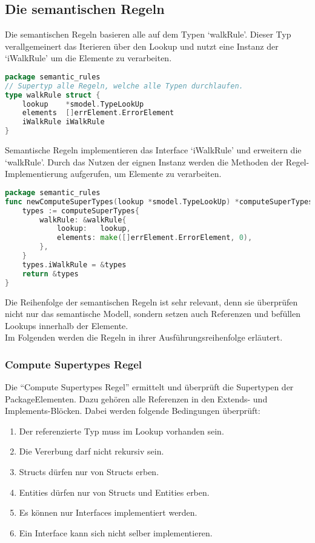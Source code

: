 \documentclass[./einleitung.tex]{subfiles}
\begin{document}
    \subsection{Die semantischen Regeln}\label{subsec:die-semantischen-regeln}
    Die semantischen Regeln basieren alle auf dem Typen `walkRule'.
    Dieser Typ verallgemeinert das Iterieren über den Lookup und nutzt eine Instanz der `iWalkRule' um die Elemente zu verarbeiten.
    \begin{lstlisting}[language=go]
package semantic_rules
// Supertyp alle Regeln, welche alle Typen durchlaufen.
type walkRule struct {
	lookup    *smodel.TypeLookUp
	elements  []errElement.ErrorElement
	iWalkRule iWalkRule
}
    \end{lstlisting}
    Semantische Regeln implementieren das Interface `iWalkRule' und erweitern die `walkRule'.
    Durch das Nutzen der eignen Instanz werden die Methoden der Regel-Implementierung aufgerufen, um Elemente zu verarbeiten.
    \begin{lstlisting}[language=go]
package semantic_rules
func newComputeSuperTypes(lookup *smodel.TypeLookUp) *computeSuperTypes {
	types := computeSuperTypes{
		walkRule: &walkRule{
			lookup:   lookup,
			elements: make([]errElement.ErrorElement, 0),
		},
	}
    types.iWalkRule = &types
    return &types
}\end{lstlisting}

    Die Reihenfolge der semantischen Regeln ist sehr relevant, denn sie überprüfen nicht nur das semantische Modell, sondern setzen auch Referenzen und befüllen Lookups innerhalb der Elemente. \\
    Im Folgenden werden die Regeln in ihrer Ausführungsreihenfolge erläutert.

    \subsubsection{Compute Supertypes Regel}
    Die ``Compute Supertypes Regel'' ermittelt und überprüft die Supertypen der PackageElementen.
    Dazu gehören alle Referenzen in den Extends- und Implements-Blöcken.
    Dabei werden folgende Bedingungen überprüft:
    \begin{enumerate}
        \item Der referenzierte Typ muss im Lookup vorhanden sein.
        \item Die Vererbung darf nicht rekursiv sein.
        \item Structs dürfen nur von Structs erben.
        \item Entities dürfen nur von Structs und Entities erben.
        \item Es können nur Interfaces implementiert werden.
        \item Ein Interface kann sich nicht selber implementieren.
    \end{enumerate}
\end{document}
